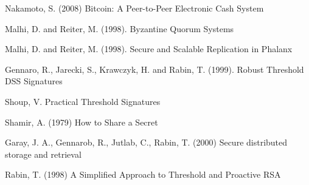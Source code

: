 \begin{thebibliography}{99}

  Nakamoto, S. (2008) Bitcoin: A Peer-to-Peer Electronic Cash System

  Malhi, D. and Reiter, M. (1998). Byzantine Quorum Systems

  Malhi, D. and Reiter, M. (1998). Secure and Scalable Replication in Phalanx

  Gennaro, R., Jarecki, S., Krawczyk, H. and Rabin, T. (1999). Robust
  Threshold DSS Signatures

  Shoup, V. Practical Threshold Signatures
  
  Shamir, A. (1979) How to Share a Secret

  Garay, J. A., Gennarob, R., Jutlab, C., Rabin, T. (2000)  Secure
  distributed storage and retrieval

  Rabin, T. (1998) A Simplified Approach to Threshold and Proactive RSA

\end{thebibliography}
